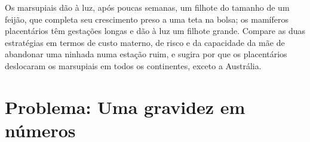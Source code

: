\begin{exercise}[$\star\star\star$]\label{exo:b2:mammal-reproduction:12}
Os marsupiais dão à luz, após poucas semanas, um filhote do tamanho de
um feijão, que completa seu crescimento preso a uma teta na bolsa; os
mamíferos placentários têm gestações longas e dão à luz um filhote
grande. Compare as duas estratégias em termos de custo materno, de
risco e da capacidade da mãe de abandonar uma ninhada numa estação
ruim, e sugira por que os placentários deslocaram os marsupiais em
todos os continentes, exceto a Austrália.
\end{exercise}

\section{Problema: Uma gravidez em números}

